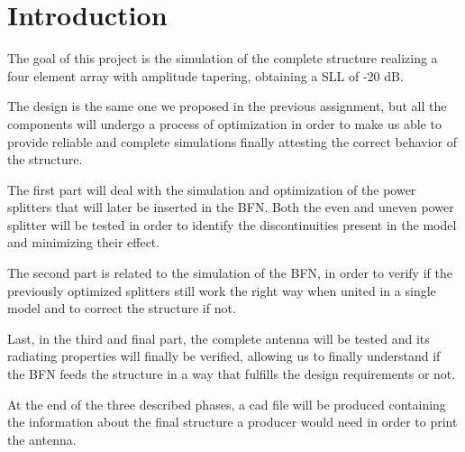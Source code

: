 \section{Introduction}
The goal of this project is the simulation of the complete structure realizing a four element array with amplitude tapering, obtaining a SLL of -20 dB.

\par\medskip
\noindent
The design is the same one we proposed in the previous assignment, but all the components will undergo a process of optimization in order to make us able to provide reliable and complete simulations finally attesting the correct behavior of the structure.

\par\medskip
\noindent
The first part will deal with the simulation and optimization of the power splitters that will later be inserted in the BFN. Both the even and uneven power splitter will be tested in order to identify the discontinuities present in the model and minimizing their effect.


\par\medskip
\noindent
The second part is related to the simulation of the BFN, in order to verify if the previously optimized splitters still work the right way when united in a single model and to correct the structure if not.


\par\medskip
\noindent
Last, in the third and final part, the complete antenna will be tested and its radiating properties will finally be verified, allowing us to finally understand if the BFN feeds the structure in a way that fulfills the design requirements or not.

\par\medskip
\noindent
At the end of the three described phases, a cad file will be produced containing the information about the final structure a producer would need in order to print the antenna.